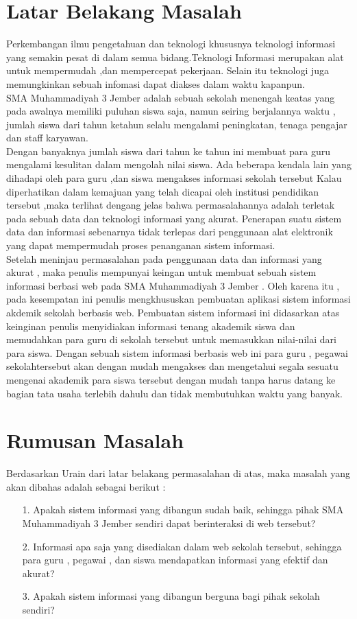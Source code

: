 \documentclass{jtetiproposalskripsi}
\begin{document}
\section{Latar Belakang Masalah}
Perkembangan ilmu pengetahuan dan teknologi khususnya teknologi informasi yang semakin pesat di dalam semua bidang.Teknologi Informasi merupakan alat untuk mempermudah ,dan  mempercepat pekerjaan. Selain itu teknologi juga memungkinkan sebuah infomasi dapat diakses dalam waktu kapanpun.\\

SMA Muhammadiyah 3 Jember adalah sebuah sekolah menengah keatas yang pada awalnya memiliki puluhan siswa saja, namun seiring berjalannya waktu , jumlah siswa dari tahun ketahun selalu mengalami peningkatan, tenaga pengajar dan staff karyawan.\\

Dengan banyaknya jumlah siswa dari tahun ke tahun ini 	membuat para guru mengalami kesulitan dalam mengolah nilai siswa. Ada beberapa kendala lain yang dihadapi oleh para guru ,dan siswa mengakses informasi sekolah tersebut
Kalau diperhatikan dalam kemajuan yang telah dicapai oleh institusi pendidikan tersebut ,maka terlihat dengang jelas bahwa permasalahannya adalah terletak pada sebuah data dan teknologi informasi yang akurat. Penerapan suatu sistem data dan informasi sebenarnya tidak terlepas dari penggunaan alat elektronik yang dapat mempermudah proses penanganan sistem informasi.\\

Setelah meninjau permasalahan pada penggunaan data dan informasi yang akurat , maka penulis mempunyai keingan untuk membuat sebuah sistem informasi berbasi web pada SMA Muhammadiyah 3 Jember . Oleh karena itu , pada kesempatan ini penulis mengkhususkan pembuatan aplikasi sistem informasi akdemik sekolah berbasis web. Pembuatan sistem informasi ini didasarkan atas keinginan penulis menyidiakan informasi tenang akademik siswa dan memudahkan para guru di sekolah tersebut untuk memasukkan nilai-nilai dari para siswa. Dengan sebuah sistem informasi berbasis web ini para guru , pegawai sekolahtersebut akan dengan mudah mengakses dan mengetahui segala sesuatu mengenai akademik para siswa tersebut dengan mudah tanpa harus datang ke bagian tata usaha terlebih dahulu dan tidak  membutuhkan waktu yang banyak.
\section{Rumusan Masalah}
Berdasarkan Urain dari latar belakang permasalahan di atas, maka masalah yang  akan dibahas adalah sebagai berikut :
\begin{itemize}


\item[1.]	Apakah sistem informasi yang dibangun sudah baik, sehingga pihak SMA Muhammadiyah 3 Jember sendiri dapat berinteraksi di web tersebut?
\item[2.]	Informasi apa saja  yang disediakan dalam web sekolah tersebut, sehingga para guru , pegawai , dan siswa  mendapatkan informasi yang efektif dan akurat?
\item[3.] Apakah sistem informasi yang dibangun berguna bagi pihak sekolah sendiri?
\end{itemize}
\end{document}
